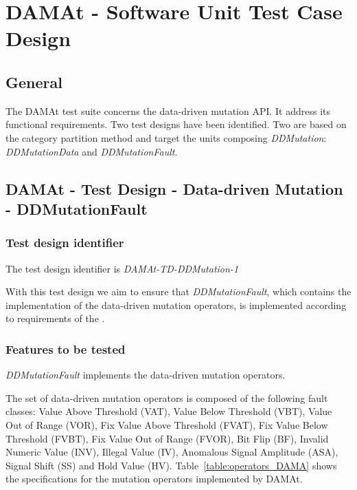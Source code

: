 
\chapter{DAMAt - Software Unit Test Case Design}
\label{chap:design_DAMAt}


\section{General}

The DAMAt test suite concerns the data-driven mutation API. It address its functional requirements. Two test designs have been identified. Two are based on the category partition method and target the units composing \emph{DDMutation}: \emph{DDMutationData} and \emph{DDMutationFault}.

\section{DAMAt - Test Design - Data-driven Mutation - DDMutationFault}

\subsection{Test design identifier}

The test design identifier is \emph{DAMAt-TD-DDMutation-1}

With this test design we aim to ensure that \emph{DDMutationFault}, which contains the implementation of the data-driven mutation operators, is implemented according to requirements of the \FAQAS.

\subsection{Features to be tested}

\emph{DDMutationFault} implements the data-driven mutation operators.

The set of data-driven mutation operators  is composed of the following fault classes: Value Above Threshold (VAT), Value Below Threshold (VBT), Value Out of Range (VOR), Fix Value Above Threshold (FVAT), Fix Value Below Threshold (FVBT), Fix Value Out of Range (FVOR),  Bit Flip (BF), Invalid Numeric Value (INV), Illegal Value (IV), Anomalous Signal Amplitude (ASA), Signal Shift (SS) and Hold Value (HV).
Table~\ref{table:operators_DAMA} shows the specifications for the mutation operators implemented by DAMAt.

